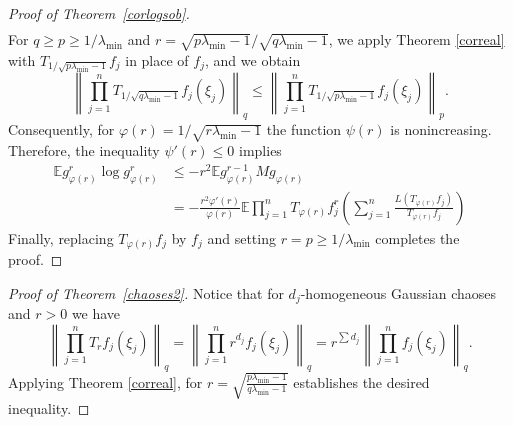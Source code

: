 \documentclass[9pt, a4paper]{amsart}
\newcommand{\1}{{\chi_{}}}%
\numberwithin{equation}{section}
\begin{document}
\begin{proof}[Proof of Theorem~\ref{corlogsob}]
\begin{align*}
\end{align*}
For \( q \geq p \geq 1/\lambda_{\min} \) and \( r = \sqrt{p\lambda_{\min}-1} / \sqrt{q\lambda_{\min}-1} \), we apply Theorem \ref{correal} with \( T_{1/\sqrt{p\lambda_{\min}-1}} f_j \) in place of \( f_j \), 
 and we obtain  
\begin{equation*}
	\left\| \prod_{j=1}^{n} T_{1/\sqrt{q\lambda_{\min}-1}} f_j(\xi_{j}) \right\|_{q}  
	\leq \left\| \prod_{j=1}^{n} T_{1/\sqrt{p\lambda_{\min}-1}} f_j(\xi_{j}) \right\|_{p}.
\end{equation*}
Consequently, for $\varphi(r)=1/\sqrt{r\lambda_{\min}-1}$ the function $\psi(r)$ is nonincreasing. Therefore, the inequality $\psi'(r)\leq 0$ implies
\begin{align*}
 \mathbb{E}g_{\varphi(r)}^{r}\log g_{\varphi(r)}^{r}&\leq -r^2 \mathbb{E}g_{\varphi(r)}^{r-1}Mg_{\varphi(r)}\\
   &=-\frac{r^2\varphi'(r)}{\varphi(r)} \mathbb{E}\prod_{j=1}^nT_{\varphi(r)}f_j^r\left( \sum_{j=1}^n
\frac{L(T_{\varphi(r)}f_j)}{T_{\varphi(r)}f_j}\right)
\end{align*} 
Finally, replacing $T_{\varphi(r)}f_j$ by $f_j$ and setting $r=p\geq 1/\lambda_{\min}$ completes the proof.
\end{proof}

\begin{proof}[Proof of Theorem~\ref{chaoses2}]
  Notice that for $d_j$-homogeneous Gaussian chaoses and $r>0$ we have
\begin{equation*}
\left\|\prod_{j=1}^{n}T_rf_{j}(\xi_{j})\right\|_{q}=\left\|\prod_{j=1}^{n}r^{d_j}f_{j}(\xi_{j})\right\|_{q}=r^{\sum d_j}\left\|\prod_{j=1}^{n}f_{j}(\xi_{j})\right\|_{q}.
\end{equation*}
Applying Theorem \ref{correal}, for $r = \sqrt{\frac{p\lambda_{\min}-1}{q\lambda_{\min}-1}}$ establishes the desired inequality.  
\end{proof}
\end{document}
